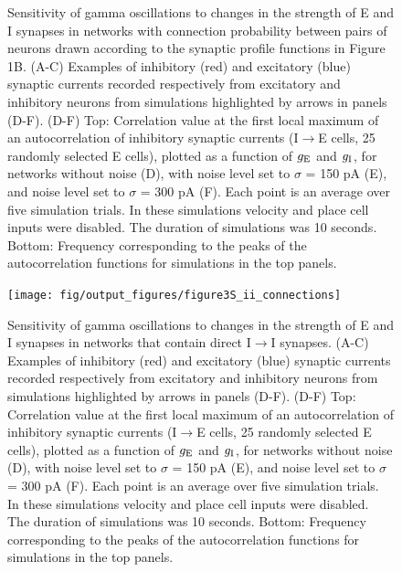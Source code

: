 \documentclass[a4paper,12pt]{article}
\newcommand{\ssc}[3]{\ensuremath{#1_{\text{#2}_{\text{#3}}}}}
\newcommand{\gE      }{\ssc{g}      {\scriptsize{E}}{}}
\newcommand{\gI      }{\ssc{g}      {\scriptsize{I}}{}}
\begin{document}
\begin{figure}[H]
    \internallinenumbers
    \caption{Sensitivity of gamma oscillations to changes in the strength of E
    and I synapses in networks with connection probability between pairs of
    neurons drawn according to the synaptic profile functions in Figure 1B.
    (A-C) Examples of inhibitory (red) and excitatory (blue) synaptic currents
    recorded respectively from excitatory and inhibitory neurons from
    simulations highlighted by arrows in panels (D-F).  (D-F) Top: Correlation
    value at the first local maximum of an autocorrelation of inhibitory
    synaptic currents (I$\rightarrow$E cells, 25 randomly selected E cells),
    plotted as a function of $\gE$ and $\gI$, for networks without noise (D), with
    noise level set to $\sigma$ = 150 pA (E), and noise level set to $\sigma$ =
    300 pA (F). Each point is an average over five simulation trials. In these
    simulations velocity and place cell inputs were disabled.  The duration of
    simulations was 10 seconds.  Bottom: Frequency corresponding to the peaks
    of the autocorrelation functions for simulations in the top panels.}
\end{figure}

\clearpage

\begin{figure}[p]
    \internallinenumbers
    \centering
        \texttt{[image: fig/output\_figures/figure3S\_ii\_connections]}
\end{figure}

\clearpage

\begin{figure}[H]
    \internallinenumbers
    \caption{Sensitivity of gamma oscillations to changes in the strength of E
    and I synapses in networks that contain direct I$\rightarrow$I synapses.
    (A-C) Examples of inhibitory (red) and excitatory (blue) synaptic currents
    recorded respectively from excitatory and inhibitory neurons from
    simulations highlighted by arrows in panels (D-F).  (D-F) Top: Correlation
    value at the first local maximum of an autocorrelation of inhibitory
    synaptic currents (I$\rightarrow$E cells, 25 randomly selected E cells),
    plotted as a function of $\gE$ and $\gI$, for networks without noise (D), with
    noise level set to $\sigma$ = 150 pA (E), and noise level set to $\sigma$ =
    300 pA (F). Each point is an average over five simulation trials. In these
    simulations velocity and place cell inputs were disabled.  The duration of
    simulations was 10 seconds.  Bottom: Frequency corresponding to the peaks
    of the autocorrelation functions for simulations in the top panels.}
\end{figure}
\end{document}
